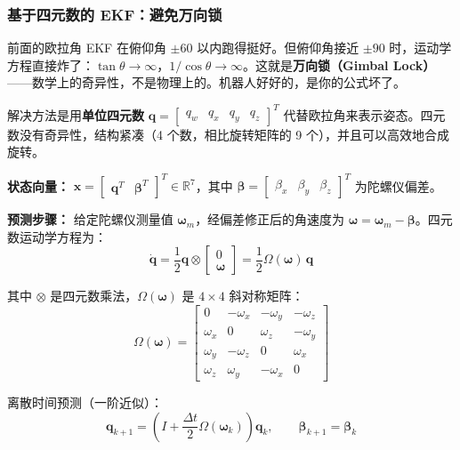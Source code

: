 \subsubsection{基于四元数的 EKF：避免万向锁}

前面的欧拉角 EKF 在俯仰角 $\pm 60$\textdegree{} 以内跑得挺好。但俯仰角接近 $\pm 90$\textdegree{} 时，运动学方程直接炸了：$\tan\theta \to \infty$，$1/\cos\theta \to \infty$。这就是\textbf{万向锁（Gimbal Lock）}——数学上的奇异性，不是物理上的。机器人好好的，是你的公式坏了。

解决方法是用\textbf{单位四元数} $\mathbf{q} = \begin{bmatrix} q_w & q_x & q_y & q_z \end{bmatrix}^T$ 代替欧拉角来表示姿态。四元数没有奇异性，结构紧凑（4 个数，相比旋转矩阵的 9 个），并且可以高效地合成旋转。

\textbf{状态向量：} $\mathbf{x} = \begin{bmatrix} \mathbf{q}^T & \boldsymbol{\beta}^T \end{bmatrix}^T \in \mathbb{R}^7$，其中 $\boldsymbol{\beta} = \begin{bmatrix} \beta_x & \beta_y & \beta_z \end{bmatrix}^T$ 为陀螺仪偏差。

\textbf{预测步骤：} 给定陀螺仪测量值 $\boldsymbol{\omega}_m$，经偏差修正后的角速度为 $\boldsymbol{\omega} = \boldsymbol{\omega}_m - \boldsymbol{\beta}$。四元数运动学方程为：
\begin{equation}
\dot{\mathbf{q}} = \frac{1}{2}\mathbf{q} \otimes \begin{bmatrix} 0 \\ \boldsymbol{\omega} \end{bmatrix}
= \frac{1}{2}\Omega(\boldsymbol{\omega})\,\mathbf{q}
\end{equation}

其中 $\otimes$ 是四元数乘法，$\Omega(\boldsymbol{\omega})$ 是 $4\times 4$ 斜对称矩阵：
\begin{equation}
\Omega(\boldsymbol{\omega}) = \begin{bmatrix}
0 & -\omega_x & -\omega_y & -\omega_z \\
\omega_x & 0 & \omega_z & -\omega_y \\
\omega_y & -\omega_z & 0 & \omega_x \\
\omega_z & \omega_y & -\omega_x & 0
\end{bmatrix}
\end{equation}

离散时间预测（一阶近似）：
\begin{equation}
\mathbf{q}_{k+1} = \left(I + \frac{\Delta t}{2}\Omega(\boldsymbol{\omega}_k)\right)\mathbf{q}_k, \qquad
\boldsymbol{\beta}_{k+1} = \boldsymbol{\beta}_k
\end{equation}

